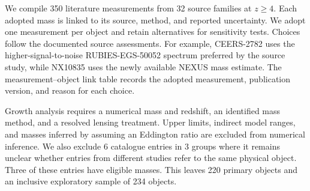 \documentclass[11pt]{article}
\begin{document}
We compile 350 literature measurements from 32 source families at $z\geq4$.
Each adopted mass is linked to its source, method, and reported uncertainty.
We adopt one measurement per object and retain alternatives for sensitivity tests.
Choices follow the documented source assessments. For example, CEERS-2782 uses
the higher-signal-to-noise RUBIES-EGS-50052 spectrum preferred by the source study,
while NX10835 uses the newly available NEXUS mass estimate. The measurement--object
link table records the adopted measurement, publication version, and reason for each choice.

Growth analysis requires a numerical mass and redshift, an identified mass
method, and a resolved lensing treatment. Upper limits, indirect model ranges,
and masses inferred by assuming an Eddington ratio are excluded from numerical
inference. We also exclude 6 catalogue entries in 3 groups where it
remains unclear whether entries from different studies refer to the same
physical object. Three of these entries have eligible masses. This leaves
220 primary objects and an inclusive exploratory sample of 234 objects.
\end{document}

